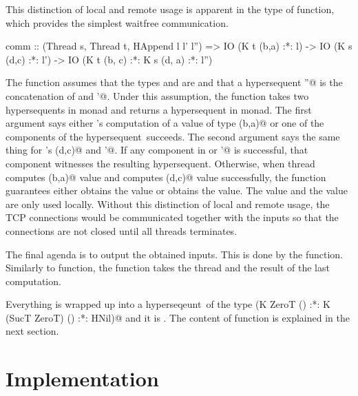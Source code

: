 This distinction of local and remote usage is apparent in the type of
\verb@comm@ function, which provides the simplest waitfree communication.
\begin{spec}
comm :: (Thread s, Thread t, HAppend l l' l'') =>
         IO (K t (b,a) :*: l)
         -> IO (K s (d,c) :*: l')
         -> IO (K t (b, c) :*: K s (d, a) :*: l'')
\end{spec}
The \verb@comm@ function assumes that the types \verb@s@ and \verb@t@ are \verb@Thread@s and
that a hypersequent \verb@l''@ is the concatenation of \verb@l@ and \verb@l'@.
Under this assumption, the function takes two hypersequents in \verb@IO@
monad and returns
a hypersequent in \verb@IO@ monad.
The first argument says either \verb@t@'s computation of a value of type
\verb@(b,a)@ or one of the components of the hypersequent~\verb@l@ succeeds.
The second argument says the same thing for \verb@s@'s \verb@(d,c)@ and \verb@l'@.
If any component in \verb@l@ or \verb@l'@ is successful, that component witnesses the
resulting hypersequent.  Otherwise, when
thread \verb@t@
computes \verb@(b,a)@ value and
\verb@s@ computes \verb@(d,c)@ value successfully, the \verb@comm@ function guarantees either
\verb@t@ obtains the \verb@c@ value or \verb@s@ obtains the \verb@a@ value.  The \verb@b@ value
and the \verb@d@ value are only used locally.  Without this distinction of
local and remote usage, the TCP connections would be communicated
together with the inputs so that the connections are not closed until all
threads terminates.

The final agenda is to output the obtained inputs.  This is done by the
\verb@printTaken@ function.
Similarly to \verb@readLine@ function, the \verb@printTaken@ function takes the
thread and the result of the last computation.

Everything is wrapped up into a hyperseqeunt~\verb@content@ of the type
\verb@IO (K ZeroT () :*: K (SucT ZeroT) () :*: HNil)@
and it is \verb@execute@d.  The content of \verb@execute@ function is explained in
the next section.

\section{Implementation}

